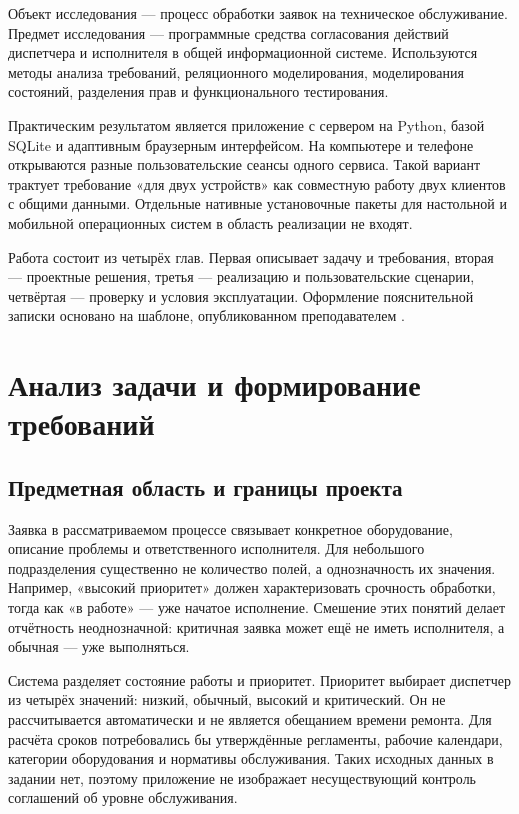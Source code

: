 \documentclass{timcw}
\begin{document}
Объект исследования — процесс обработки заявок на техническое обслуживание. Предмет исследования — программные средства согласования действий диспетчера и исполнителя в общей информационной системе. Используются методы анализа требований, реляционного моделирования, моделирования состояний, разделения прав и функционального тестирования.

Практическим результатом является приложение с сервером на Python, базой SQLite и адаптивным браузерным интерфейсом. На компьютере и телефоне открываются разные пользовательские сеансы одного сервиса. Такой вариант трактует требование «для двух устройств» как совместную работу двух клиентов с общими данными. Отдельные нативные установочные пакеты для настольной и мобильной операционных систем в область реализации не входят.

Работа состоит из четырёх глав. Первая описывает задачу и требования, вторая — проектные решения, третья — реализацию и пользовательские сценарии, четвёртая — проверку и условия эксплуатации. Оформление пояснительной записки основано на шаблоне, опубликованном преподавателем \cite{src1}.

\chapter{Анализ задачи и формирование требований}

\section{Предметная область и границы проекта}

Заявка в рассматриваемом процессе связывает конкретное оборудование, описание проблемы и ответственного исполнителя. Для небольшого подразделения существенно не количество полей, а однозначность их значения. Например, «высокий приоритет» должен характеризовать срочность обработки, тогда как «в работе» — уже начатое исполнение. Смешение этих понятий делает отчётность неоднозначной: критичная заявка может ещё не иметь исполнителя, а обычная — уже выполняться.

Система разделяет состояние работы и приоритет. Приоритет выбирает диспетчер из четырёх значений: низкий, обычный, высокий и критический. Он не рассчитывается автоматически и не является обещанием времени ремонта. Для расчёта сроков потребовались бы утверждённые регламенты, рабочие календари, категории оборудования и нормативы обслуживания. Таких исходных данных в задании нет, поэтому приложение не изображает несуществующий контроль соглашений об уровне обслуживания.
\end{document}
